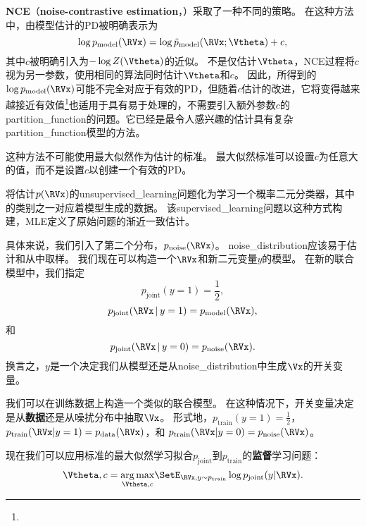 \textbf{\gls{NCE}}（\textbf{noise-contrastive estimation}，）\citep{Gutmann+Hyvarinen-2010}采取了一种不同的策略。
 在这种方法中，由模型估计的\gls{PD}被明确表示为
\begin{equation}
	\log p_{\text{model}} (\RVx) = \log \tilde{p}_{\text{model}} (\RVx; \Vtheta) + c,
\end{equation}
其中$c$被明确引入为$-\log Z(\Vtheta)$的近似。
不是仅估计$\Vtheta$，\gls{NCE}过程将$c$视为另一参数，使用相同的算法同时估计$\Vtheta$和$c$。
因此，所得到的$\log p_{\text{model}}(\RVx)$可能不完全对应于有效的\gls{PD}，但随着$c$估计的改进，它将变得越来越接近有效值\footnote{}也适用于具有易于处理的，不需要引入额外参数$c$的\gls{partition_function}的问题。它已经是最令人感兴趣的估计具有复杂\gls{partition_function}模型的方法。


这种方法不可能使用最大似然作为估计的标准。
最大似然标准可以设置$c$为任意大的值，而不是设置$c$以创建一个有效的\gls{PD}。


将估计$p(\RVx)$的\gls{unsupervised_learning}问题化为学习一个概率二元分类器，其中的类别之一对应着模型生成的数据。
该\gls{supervised_learning}问题以这种方式构建，\gls{MLE}定义了原始问题的渐近一致估计。


具体来说，我们引入了第二个分布，$p_{\text{noise}}(\RVx)$。
\gls{noise_distribution}应该易于估计和从中取样。
我们现在可以构造一个$\RVx$和新二元变量$y$的模型。
在新的联合模型中，我们指定
\begin{equation}
	p_{\text{joint}} (y = 1) = \frac{1}{2},
\end{equation}
\begin{equation}
	p_{\text{joint}} (\RVx \,|\, y = 1) = p_{\text{model}} (\RVx),
\end{equation}
和
\begin{equation}
	p_{\text{joint}} (\RVx \,|\, y = 0) = p_{\text{noise}}(\RVx).
\end{equation}
换言之，$y$是一个决定我们从模型还是从\gls{noise_distribution}中生成$\Vx$的开关变量。


我们可以在训练数据上构造一个类似的联合模型。
在这种情况下，开关变量决定是从\textbf{数据}还是从噪扰分布中抽取$\Vx$。
形式地，$p_{\text{train}}(y = 1) = \frac{1}{2}$，$p_{\text{train}}( \RVx | y = 1) = p_{\text{data}}( \RVx)$，和
$p_{\text{train}}(\RVx | y = 0) = p_{\text{noise}}(\RVx)$。


现在我们可以应用标准的最大似然学习拟合$p_{\text{joint}}$到$p_{\text{train}}$的\textbf{监督}学习问题：
\begin{equation}
	\Vtheta, c = \underset{ \Vtheta, c}{\arg\max} \SetE_{\RVx, y \sim p_{\text{train}}} \log 
	p_{\text{joint}} (y | \RVx).
\end{equation}


